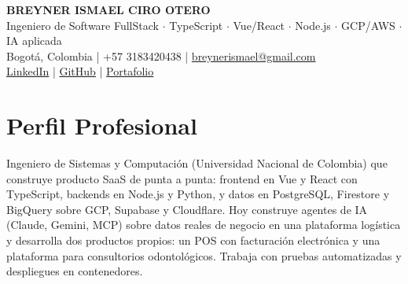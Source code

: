 \documentclass[11pt,a4paper]{article}
\begin{document}
\begin{center}
    {\huge \textbf{BREYNER ISMAEL CIRO OTERO}} \\ \vspace{0.15cm}
    {\large Ingeniero de Software FullStack $\cdot$ TypeScript $\cdot$ Vue/React $\cdot$ Node.js $\cdot$ GCP/AWS $\cdot$ IA aplicada} \\ \vspace{0.15cm}
    Bogotá, Colombia | +57 3183420438 | \href{mailto:breynerismael@gmail.com}{breynerismael@gmail.com} \\ \vspace{0.1cm}
    \href{https://www.linkedin.com/in/breyner-ciro-38011330b/}{LinkedIn} | \href{https://github.com/breynerciro}{GitHub} | \href{https://breynerciro.github.io/}{Portafolio}
\end{center}

\vspace{0.2cm}

\section*{Perfil Profesional}
Ingeniero de Sistemas y Computación (Universidad Nacional de Colombia) que construye producto SaaS de punta a punta: frontend en Vue y React con TypeScript, backends en Node.js y Python, y datos en PostgreSQL, Firestore y BigQuery sobre GCP, Supabase y Cloudflare. Hoy construye agentes de IA (Claude, Gemini, MCP) sobre datos reales de negocio en una plataforma logística y desarrolla dos productos propios: un POS con facturación electrónica y una plataforma para consultorios odontológicos. Trabaja con pruebas automatizadas y despliegues en contenedores.

\end{document}

